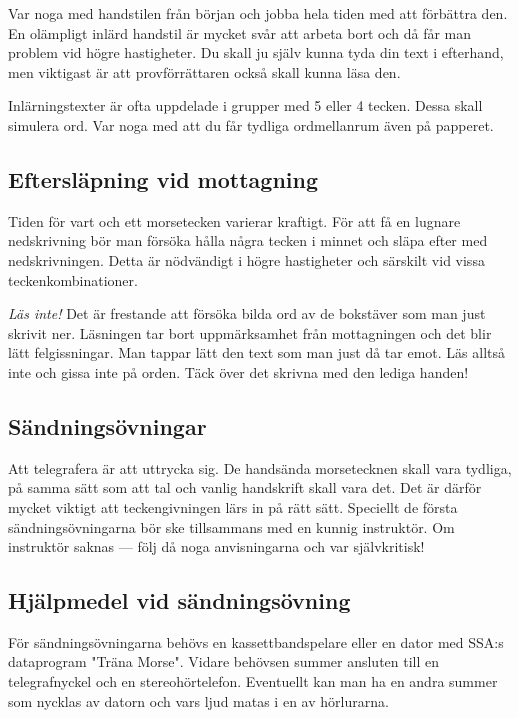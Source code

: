Var noga med handstilen från början och jobba hela tiden med att förbättra den.
En olämpligt inlärd handstil är mycket svår att arbeta bort och då får man
problem vid högre hastigheter. Du skall ju själv kunna tyda din text i
efterhand, men viktigast är att provförrättaren också skall kunna läsa den.

Inlärningstexter är ofta uppdelade i grupper med 5 eller 4 tecken. Dessa skall
simulera ord. Var noga med att du får tydliga ordmellanrum även på papperet.

\subsection{Eftersläpning vid mottagning}

Tiden för vart och ett morsetecken varierar kraftigt. För att få en lugnare
nedskrivning bör man försöka hålla några tecken i minnet och släpa efter med
nedskrivningen. Detta är nödvändigt i högre hastigheter och särskilt vid vissa
teckenkombinationer.

\emph{Läs inte!} Det är frestande att försöka bilda ord av de bokstäver som man
just skrivit ner. Läsningen tar bort uppmärksamhet från mottagningen och det
blir lätt felgissningar. Man tappar lätt den text som man just då tar emot. Läs
alltså inte och gissa inte på orden. Täck över det skrivna med den lediga
handen!

\subsection{Sändningsövningar}

Att telegrafera är att uttrycka sig. De handsända morsetecknen skall vara
tydliga, på samma sätt som att tal och vanlig handskrift skall vara det. Det är
därför mycket viktigt att teckengivningen lärs in på rätt sätt. Speciellt de
första sändningsövningarna bör ske tillsammans med en kunnig instruktör. Om
instruktör saknas --- följ då noga anvisningarna och var självkritisk!

\subsection{Hjälpmedel vid sändningsövning}

För sändningsövningarna behövs en kassettbandspelare eller en dator med SSA:s
dataprogram "Träna Morse". Vidare behövsen summer ansluten till en
telegrafnyckel och en stereohörtelefon. Eventuellt kan man ha en andra summer
som nycklas av datorn och vars ljud matas i en av hörlurarna.

